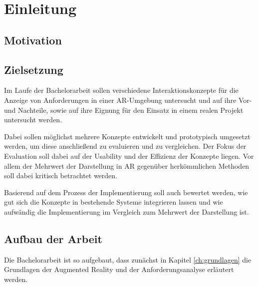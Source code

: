 \chapter{Einleitung}

\section{Motivation}

\section{Zielsetzung}

Im Laufe der Bachelorarbeit sollen verschiedene Interaktionskonzepte für die Anzeige von Anforderungen in einer AR-Umgebung untersucht und auf ihre Vor- und Nachteile, sowie auf ihre Eignung für den Einsatz in einem realen Projekt untersucht werden.

Dabei sollen möglichst mehrere Konzepte entwickelt und prototypisch umgesetzt werden, um diese anschließend zu evaluieren und zu vergleichen.
Der Fokus der Evaluation soll dabei auf der Usability und der Effizienz der Konzepte liegen.
Vor allem der Mehrwert der Darstellung in AR gegenüber herkömmlichen Methoden soll dabei kritisch betrachtet werden.

Basierend auf dem Prozess der Implementierung soll auch bewertet werden, wie gut sich die Konzepte in bestehende Systeme integrieren lassen und wie aufwändig die Implementierung im Vergleich zum Mehrwert der Darstellung ist.

\section{Aufbau der Arbeit}

Die Bachelorarbeit ist so aufgebaut, dass zunächst in Kapitel \ref{ch:grundlagen} die Grundlagen der Augmented Reality und der Anforderungsanalyse erläutert werden.